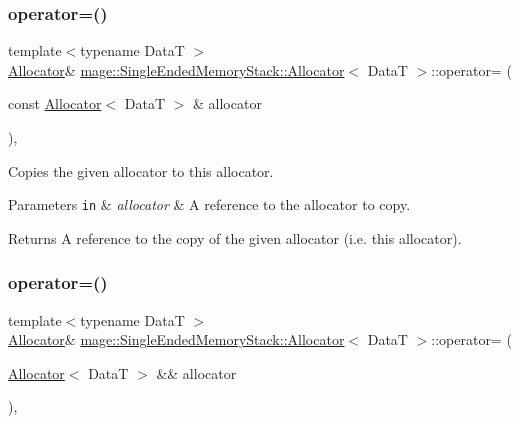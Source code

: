 \subsubsection{\texorpdfstring{operator=()}{operator=()}\hspace{0.1cm}{\footnotesize\ttfamily [1/2]}}
{\footnotesize\ttfamily template$<$typename DataT $>$ \\
\hyperlink{structmage_1_1_single_ended_memory_stack_1_1_allocator}{Allocator}\& \hyperlink{structmage_1_1_single_ended_memory_stack_1_1_allocator}{mage\+::\+Single\+Ended\+Memory\+Stack\+::\+Allocator}$<$ DataT $>$\+::operator= (\begin{DoxyParamCaption}\item[{const \hyperlink{structmage_1_1_single_ended_memory_stack_1_1_allocator}{Allocator}$<$ DataT $>$ \&}]{allocator }\end{DoxyParamCaption})\hspace{0.3cm}{\ttfamily [delete]}, {\ttfamily [noexcept]}}

Copies the given allocator to this allocator.


\begin{DoxyParams}[1]{Parameters}
\mbox{\tt in}  & {\em allocator} & A reference to the allocator to copy. \\
\hline
\end{DoxyParams}
\begin{DoxyReturn}{Returns}
A reference to the copy of the given allocator (i.\+e. this allocator). 
\end{DoxyReturn}
\hypertarget{structmage_1_1_single_ended_memory_stack_1_1_allocator_abdf76d57fb2996142cea23883433a097}{}\label{structmage_1_1_single_ended_memory_stack_1_1_allocator_abdf76d57fb2996142cea23883433a097} 
\subsubsection{\texorpdfstring{operator=()}{operator=()}\hspace{0.1cm}{\footnotesize\ttfamily [2/2]}}
{\footnotesize\ttfamily template$<$typename DataT $>$ \\
\hyperlink{structmage_1_1_single_ended_memory_stack_1_1_allocator}{Allocator}\& \hyperlink{structmage_1_1_single_ended_memory_stack_1_1_allocator}{mage\+::\+Single\+Ended\+Memory\+Stack\+::\+Allocator}$<$ DataT $>$\+::operator= (\begin{DoxyParamCaption}\item[{\hyperlink{structmage_1_1_single_ended_memory_stack_1_1_allocator}{Allocator}$<$ DataT $>$ \&\&}]{allocator }\end{DoxyParamCaption})\hspace{0.3cm}{\ttfamily [delete]}, {\ttfamily [noexcept]}}

